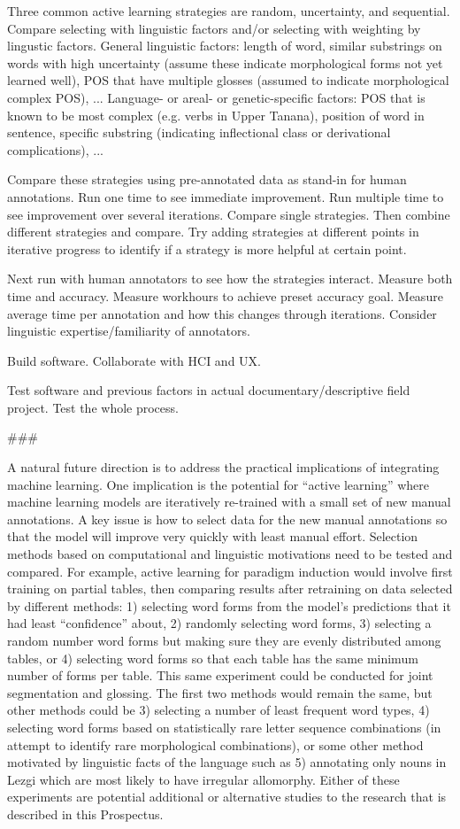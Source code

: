 Three common active learning strategies are random, uncertainty, and sequential. Compare selecting with linguistic factors and/or selecting with weighting by lingustic factors. General linguistic factors: length of word, similar substrings on words with high uncertainty (assume these indicate morphological forms not yet learned well), POS that have multiple glosses (assumed to indicate morphological complex POS), ...
Language- or areal- or genetic-specific factors: POS that is known to be most complex (e.g. verbs in Upper Tanana), position of word in sentence, specific substring (indicating inflectional class or derivational complications), ...

Compare these strategies using pre-annotated data as stand-in for human annotations. Run one time to see immediate improvement. Run multiple time to see improvement over several iterations. Compare single strategies. Then combine different strategies and compare. Try adding strategies at different points in iterative progress to identify if a strategy is more helpful at certain point. 

Next run with human annotators to see how the strategies interact. Measure both time and accuracy. Measure workhours to achieve preset accuracy goal. Measure average time per annotation and how this changes through iterations. Consider linguistic expertise/familiarity of annotators. 

Build software. Collaborate with HCI and UX. 

Test software and previous factors in actual documentary/descriptive field project. Test the whole process.

\#\#\#

A natural future direction is to address the practical implications of integrating machine learning. One implication is the potential for ``active learning'' where machine learning models are iteratively re-trained with a small set of new manual annotations. A key issue is how to select data for the new manual annotations so that the model will improve very quickly with least manual effort. Selection methods based on computational and linguistic motivations need to be tested and compared. For example, active learning for paradigm induction would involve first training on partial tables, then comparing results after retraining on data selected by different methods: 1) selecting word forms from the model’s predictions that it had least ``confidence'' about, 2) randomly selecting word forms, 3) selecting a random number word forms but making sure they are evenly distributed among tables, or 4) selecting word forms so that each table has the same minimum number of forms per table. This same experiment could be conducted for joint segmentation and glossing. The first two methods would remain the same, but other methods could be 3) selecting a number of least frequent word types, 4) selecting word forms based on statistically rare letter sequence combinations (in attempt to identify rare morphological combinations), or some other method motivated by linguistic facts of the language such as 5) annotating only nouns in Lezgi which are most likely to have irregular allomorphy. Either of these experiments are potential additional or alternative studies to the research that is described in this Prospectus.
